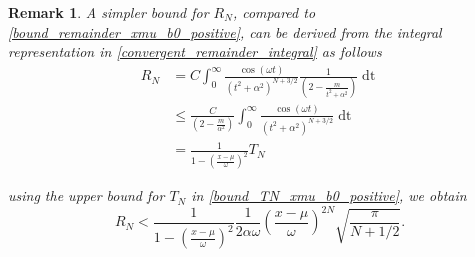 \documentclass[10pt,a4paper,oneside]{article}
\newtheorem{remark}[theorem]{Remark}
\numberwithin{equation}{section}
\begin{document}
\begin{table}[H]
	\centering
	\caption{Absolute error and bound \eqref{bound_remainder_xmu_b0_positive} estimating $N$ using \eqref{N_expansion_xmu_b0_positive} for the series expansion  \eqref{expansion_xmu_b0_positive} with machine-precision absolute error.}
	\label{table_bound_remainder_xmu_b0_positive_large_N}
\end{table}

\begin{remark}
A simpler bound for $R_N$, compared to \eqref{bound_remainder_xmu_b0_positive}, can be derived from the integral representation in \eqref{convergent_remainder_integral} as follows
\begin{align*}
R_N &= C \int_0^{\infty} \frac{\cos(\omega t)}{(t^2 + \alpha^2)^{N + 3/2}} \frac{1}{\left(2 - \frac{m}{t^2+ \alpha^2}\right)} \mathop{dt}\\
&\le \frac{C}{\left(2 - \frac{m}{\alpha^2}\right)} \int_0^{\infty} \frac{\cos(\omega t)}{(t^2 + \alpha^2)^{N + 3/2}} \mathop{dt}\\
&= \frac{1}{1 - \left(\frac{x-\mu}{\omega}\right)^2} T_N
\end{align*}

using the upper bound for $T_N$ in \eqref{bound_TN_xmu_b0_positive}, we obtain
\begin{equation}
R_N < \frac{1}{1 - \left(\frac{x-\mu}{\omega}\right)^2} \frac{1}{2\alpha\omega}\left(\frac{x-\mu}{\omega}\right)^{2N} \sqrt{\frac{\pi}{N + 1/2}}.
\end{equation}
\end{remark}
\end{document}

